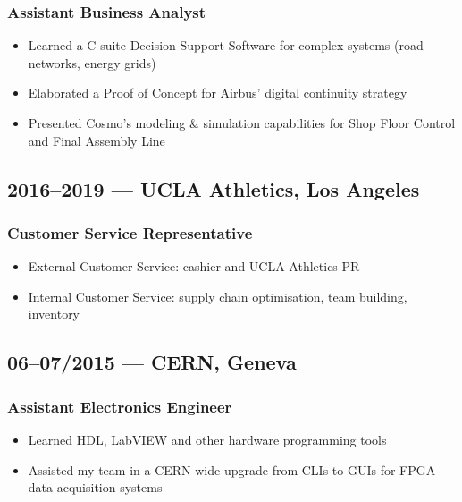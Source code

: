 \documentclass[10pt]{report}
\begin{document}
\subsubsection*{Assistant Business Analyst}
\begin{itemize}
    \item Learned a C-suite Decision Support Software for complex systems (road networks, energy grids)
    \item Elaborated a Proof of Concept for Airbus’ digital continuity strategy
    \item Presented Cosmo’s modeling \& simulation capabilities for Shop Floor Control and Final Assembly Line
\end{itemize}
\subsection*{2016--2019 --- UCLA Athletics, Los Angeles}
\subsubsection*{Customer Service Representative}
\begin{itemize}
    \item  External Customer Service: cashier and UCLA Athletics PR
    \item Internal Customer Service: supply chain optimisation, team building, inventory
\end{itemize}
\subsection*{06--07/2015 --- CERN, Geneva}
\subsubsection*{Assistant Electronics Engineer}
\begin{itemize}
    \item Learned HDL, LabVIEW and other hardware programming tools
    \item Assisted my team in a CERN-wide upgrade from CLIs to GUIs for FPGA data acquisition systems
\end{itemize}
\end{document}
